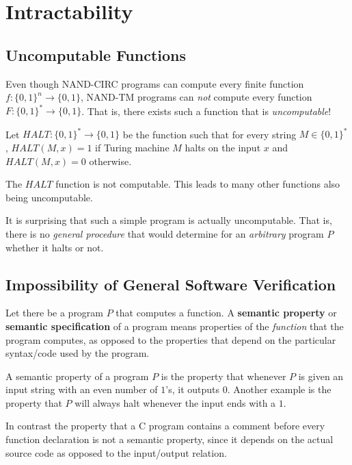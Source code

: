 \section{Intractability}

\subsection{Uncomputable Functions}

  Even though NAND-CIRC programs can compute every finite function $f: \{0,1\}^n \longrightarrow \{0,1\}$, NAND-TM programs can \textit{not} compute every function $F: \{0,1\}^* \longrightarrow \{0,1\}$. That is, there exists such a function that is \textit{uncomputable}! 

  \begin{definition}
  Let $HALT: \{0,1\}^* \longrightarrow \{0,1\}$ be the function such that for every string $M \in \{0,1\}^*$, $HALT(M, x) = 1$ if Turing machine $M$ halts on the input $x$ and $HALT(M, x) = 0$ otherwise. 
  \end{definition}

  \begin{theorem}
  The $HALT$ function is not computable. This leads to many other functions also being uncomputable. 
  \end{theorem}

  It is surprising that such a simple program is actually uncomputable. That is, there is no \textit{general procedure} that would determine for an \textit{arbitrary} program $P$ whether it halts or not. 

\subsection{Impossibility of General Software Verification}

  \begin{definition}
  Let there be a program $P$ that computes a function. A \textbf{semantic property} or \textbf{semantic specification} of a program means properties of the \textit{function} that the program computes, as opposed to the properties that depend on the particular syntax/code used by the program. 
  \end{definition}

  \begin{example}
  A semantic property of a program $P$ is the property that whenever $P$ is given an input string with an even number of $1$'s, it outputs $0$. Another example is the property that $P$ will always halt whenever the input ends with a $1$. 

  In contrast the property that a C program contains a comment before every function declaration is not a semantic property, since it depends on the actual source code as opposed to the input/output relation. 
  \end{example}

